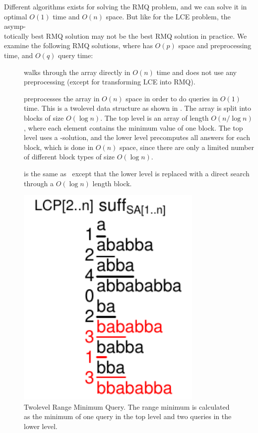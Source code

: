 \documentclass[a4]{article}
\newcommand*{\pref}{\prettyref}
\begin{document}
Different algorithms exists for solving the RMQ problem, and we can solve it in optimal $O(1)$ time and $O(n)$ space. But like for the LCE problem, the asymp-\\totically best RMQ solution may not be the best RMQ solution in practice. We examine the following RMQ solutions, where  has $O(p)$ space and preprocessing time, and $O(q)$ query time:
\begin{samepage}
\begin{description}
\item[\RMQn] walks through the array directly in $O(n)$ time and does not use any preprocessing (except for transforming LCE into RMQ).
\item[\RMQq] preprocesses the array in $O(n)$ space in order to do queries in $O(1)$ time. This is a twolevel data structure as shown in \pref{fig:sa+lcp+min-twolevel}. The array is split into blocks of size $O(\log n)$. The top level is an array of length $O(n/\log n)$, where each element contains the minimum value of one block. The top level uses a -solution, and the lower level precomputes all answers for each block, which is done in $O(n)$ space, since there are only a limited number of different block types of size $O(\log n)$.
\item[\RMQlog] is the same as \RMQq\ except that the lower level is replaced with a direct search through a $O(\log n)$ length block.
\end{description}
\end{samepage}

\begin{figure}[tp]
    \begin{center}
        \includegraphics[width=0.8\textwidth,page=2]{sa+lcp+min.pdf}
    \end{center}
    \caption{\label{fig:sa+lcp+min-twolevel}Twolevel Range Minimum Query. The range minimum is calculated as the minimum of one query in the top level and two queries in the lower level.}
\end{figure}
\end{document}
